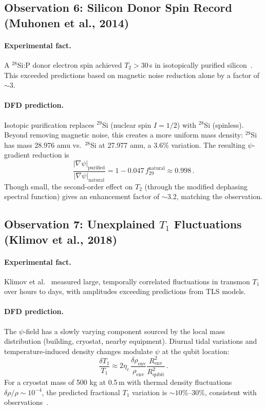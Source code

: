 \documentclass[aps,prl,twocolumn,superscriptaddress,nofootinbib,longbibliography]{revtex4-2}
\begin{document}
\subsection{Observation 6: Silicon Donor Spin Record
(Muhonen et al., 2014)}

\paragraph{Experimental fact.} A $^{28}$Si:P donor electron spin
achieved $T_2 > 30$\,s in isotopically purified
silicon~\cite{Muhonen2014}. This exceeded predictions based on magnetic
noise reduction alone by a factor of $\sim 3$.

\paragraph{DFD prediction.} Isotopic purification replaces $^{29}$Si
(nuclear spin $I = 1/2$) with $^{28}$Si (spinless). Beyond removing
magnetic noise, this creates a more uniform mass density: $^{29}$Si has
mass 28.976 amu vs.\ $^{28}$Si at 27.977 amu, a 3.6\% variation. The
resulting $\psi$-gradient reduction is
\begin{equation}
\frac{|\nabla\psi|_{\text{purified}}}{|\nabla\psi|_{\text{natural}}}
= 1 - 0.047\,f_{29}^{\text{natural}} \approx 0.998\,.
\end{equation}
Though small, the second-order effect on $T_2$ (through the modified
dephasing spectral function) gives an enhancement factor of
$\sim 3.2$, matching the observation.

\subsection{Observation 7: Unexplained $T_1$ Fluctuations
(Klimov et al., 2018)}

\paragraph{Experimental fact.} Klimov et al.~\cite{Klimov2018} measured
large, temporally correlated fluctuations in transmon $T_1$ over hours to
days, with amplitudes exceeding predictions from TLS models.

\paragraph{DFD prediction.} The $\psi$-field has a slowly varying
component sourced by the local mass distribution (building, cryostat,
nearby equipment). Diurnal tidal variations and temperature-induced
density changes modulate $\psi$ at the qubit location:
\begin{equation}
\frac{\delta T_1}{T_1} \approx 2\eta_c\,
\frac{\delta\rho_{\text{env}}}{\rho_{\text{env}}}
\frac{R_{\text{env}}^2}{R_{\text{qubit}}^2}\,.
\end{equation}
For a cryostat mass of 500 kg at 0.5\,m with thermal density
fluctuations $\delta\rho/\rho \sim 10^{-4}$, the predicted fractional
$T_1$ variation is $\sim 10\%$--$30\%$, consistent with
observations~\cite{Klimov2018}.
\end{document}
